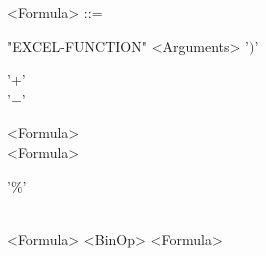 \begin{grammar}
	<Formula> ::= 
	\begin{syntdiag}[\footnotesize\sdlengths]
	\begin{stack} 
	\begin{stack}
	"EXCEL-FUNCTION" <Arguments> '$)$' \\
	\begin{stack} '$+$' \\ '$-$' \end{stack} <Formula>\\ 
	<Formula> \begin{stack} '$\%$' \end{stack}\\ 
	<Formula> <BinOp> <Formula>
	\end{stack} \\

\end{stack}
\end{syntdiag}
\end{grammar}
